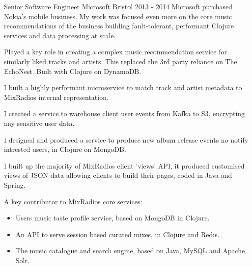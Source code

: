 \begin{cventries}
  \cventrypara
    {Senior Software Engineer} %
    {Microsoft} %
    {Bristol} %
    {2013  - 2014} %
    {Microsoft purchased Nokia's mobile business. My work was focused even more on the core music recommendations of
    the business building fault-tolerant, performant Clojure services and data processing at scale.}
    {
      \begin{cvitems} %
        \item {Played a key role in creating a complex music recommendation service for similarly liked tracks and artists. This replaced the 3rd party reliance on The EchoNest. Built with Clojure on DynamoDB.}
        \item {I built a highly performant microservice to match track and artist metadata to MixRadios internal representation.}
        \item {I created a service to warehouse client user events from Kafka to S3, encrypting any sensitive user data.}
        \item {I designed and produced a service to produce new album release events no notify intrested users, in Clojure on MongoDB.}
        \item {I built up the majority of MixRadios client ’views’ API, it produced customised views of JSON data allowing clients to build their pages, coded in Java and Spring.}
        \item {A key contributor to MixRadios core services:
            \begin{itemize}
                \item Users music taste profile service, based on MongoDB in Clojure.
                \item An API to serve session based curated mixes, in Clojure and Redis.
                \item The music catalogue and search engine, based on Java, MySQL and Apache Solr.
            \end{itemize}}
      \end{cvitems}
    }


\end{cventries}
